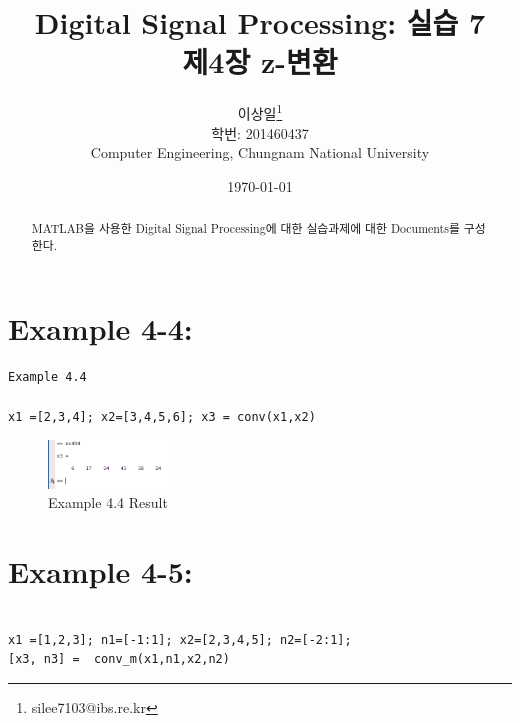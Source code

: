 \documentclass[11pt
  , a4paper
  , article
  , oneside
]{memoir}
\begin{document}
\newcommand{\technumber}{
  Digital Signal Processing using MATLAB\\
  Document 1: 2016-03-26}
\title{\textbf{Digital Signal Processing: 실습 7 \\
		제4장 z-변환 \\}}

\author{이상일\thanks{silee7103@ibs.re.kr} \\

  학번: 201460437\\
  Computer Engineering, Chungnam National University 
}
\date{\today}

\renewcommand{\maketitlehooka}{\begin{flushright}\textsf{\technumber}\end{flushright}}

\maketitle

\begin{abstract}
MATLAB을 사용한 Digital Signal Processing에 대한 실습과제에 대한 Documents를 구성한다.
\end{abstract}

\chapter{Example 4-4:}

\begin{lstlisting}[style=termstyle]
Example 4.4

x1 =[2,3,4]; x2=[3,4,5,6]; x3 = conv(x1,x2)
\end{lstlisting}

\begin{figure}[h!]
	\centering
	\includegraphics[width=0.3\textwidth,height=0.15\textwidth]{./images/ex404.png}
	\caption{Example 4.4 Result}
	\label{fig:Example 4.4 Result}
\end{figure}

\chapter{Example 4-5:}
\begin{lstlisting}[style=termstyle]
%Example 4.5

x1 =[1,2,3]; n1=[-1:1]; x2=[2,3,4,5]; n2=[-2:1];
[x3, n3] =  conv_m(x1,n1,x2,n2)
\end{lstlisting}
\end{document}
